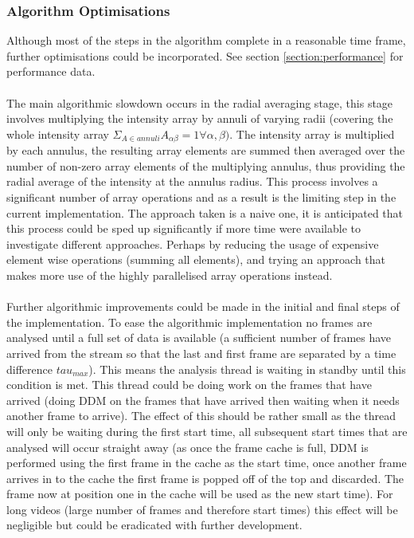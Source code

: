 \documentclass[11pt]{article}
\begin{document}
\subsubsection{Algorithm Optimisations}
Although most of the steps in the algorithm complete in a reasonable time frame, further optimisations could be incorporated. See section \ref{section:performance} for performance data. 
\\\\
The main algorithmic slowdown occurs in the radial averaging stage, this stage involves multiplying the intensity array by annuli of varying radii (covering the whole intensity array $\Sigma_{A \in annuli} A_{\alpha \beta} = 1 \forall \alpha, \beta )$. The intensity array is multiplied by each annulus, the resulting array elements are summed then averaged over the number of non-zero array elements of the multiplying annulus, thus providing the radial average of the intensity at the annulus radius. This process involves a significant number of array operations and as a result is the limiting step in the current implementation. The approach taken is a naive one, it is anticipated that this process could be sped up significantly if more time were available to investigate different approaches. Perhaps by reducing the usage of expensive element wise operations (summing all elements), and trying an approach that makes more use of the highly parallelised array operations instead.
\\\\
Further algorithmic improvements could be made in the initial and final steps of the implementation. To ease the algorithmic implementation no frames are analysed until a full set of data is available (a sufficient number of frames have arrived from the stream so that the last and first frame are separated by a time difference $tau_{max}$). This means the analysis thread is waiting in standby until this condition is met. This thread could be doing work on the frames that have arrived (doing DDM on the frames that have arrived then waiting when it needs another frame to arrive). The effect of this should be rather small as the thread will only be waiting during the first start time, all subsequent start times that are analysed will occur straight away (as once the frame cache is full, DDM is performed using the first frame in the cache as the start time, once another frame arrives in to the cache the first frame is popped off of the top and discarded. The frame now at position one in the cache will be used as the new start time). For long videos (large number of frames and therefore start times) this effect will be negligible but could be eradicated with further development. 
\end{document}
